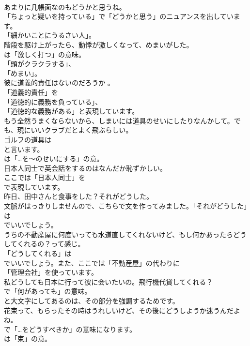 \documentclass[8pt]{extreport}
\begin{document}
\begin{CJK}{UTF8}{min}
\\	あまりに几帳面なのもどうかと思うね。 
\\	「ちょっと疑いを持っている」で「どうかと思う」のニュアンスを出しています。
\\	「細かいことにうるさい人」。	
\\	階段を駆け上がったら、動悸が激しくなって、めまいがした。 
\\	は「激しく打つ」の意味。
\\	「頭がクラクラする」、
\\	「めまい」。	
\\	彼に道義的責任はないのだろうか 。 
\\	「道義的責任」を
\\	「道徳的に義務を負っている」、
\\	「道徳的な義務がある」と表現しています。	
\\	もう全然うまくならないから、しまいには道具のせいにしたりなんかして。でも、現にいいクラブだとよく飛ぶらしい。 
\\	ゴルフの道具は 
\\	と言います。
\\	は「…を～のせいにする」の意。	
\\	日本人同士で英会話をするのはなんだか恥ずかしい。 
\\	ここでは「日本人同士」を 
\\	で表現しています。	
\\	昨日、田中さんと食事をした？それがどうした。 
\\	文脈がはっきりしませんので、こちらで文を作ってみました。「それがどうした」は
\\	でいいでしょう。	
\\	うちの不動産屋に何度いっても水道直してくれないけど、もし何かあったらどうしてくれるの？って感じ。 
\\	「どうしてくれる」は
\\	でいいでしょう。また、ここでは「不動産屋」の代わりに
\\	「管理会社」を使っています。	
\\	私どうしても日本に行って彼に会いたいの。飛行機代貸してくれる？ 
\\	で「何があっても」の意味。
\\	と大文字にしてあるのは、その部分を強調するためです。	
\\	花束って、もらったその時はうれしいけど、その後にどうしようか迷うんだよね。 
\\	で「…をどうすべきか」の意味になります。
\\	は「束」の意。	

\end{CJK}
\end{document}
